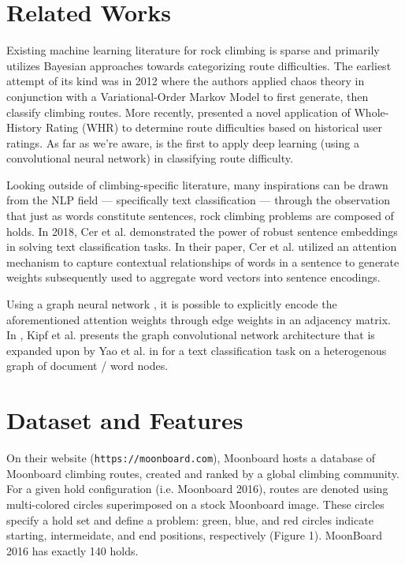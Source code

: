 \documentclass{article}
\begin{document}
\section{Related Works}
Existing machine learning literature for rock climbing is sparse and primarily utilizes Bayesian approaches towards categorizing route difficulties. The earliest attempt of its kind was in 2012 \cite{Phillips_2012} where the authors applied chaos theory in conjunction with a Variational-Order Markov Model to first generate, then classify climbing routes. More recently, \cite{scarff2020estimation} presented a novel application of Whole-History Rating (WHR) \cite{RemiCoulomWHR} to determine route difficulties based on historical user ratings. As far as we're aware, \cite{DoblesCS229} is the first to apply deep learning (using a convolutional neural network) in classifying route difficulty.

Looking outside of climbing-specific literature, many inspirations can be drawn from the NLP field --- specifically text classification --- through the observation that just as words constitute sentences, rock climbing problems are composed of holds. In 2018, Cer et al. \cite{cer2018universal} demonstrated the power of robust sentence embeddings in solving text classification tasks. In their paper, Cer et al. utilized an attention mechanism to capture contextual relationships of words in a sentence to generate weights subsequently used to aggregate word vectors into sentence encodings. 

Using a graph neural network \cite{battaglia2018relational}, it is possible to explicitly encode the aforementioned attention weights through edge weights in an adjacency matrix. In \cite{kipf2016semisupervised}, Kipf et al. presents the graph convolutional network architecture that is expanded upon by Yao et al. in \cite{yao2018graph} for a text classification task on a heterogenous graph of document / word nodes.

\section{Dataset and Features}
On their website (\texttt{https://moonboard.com}), Moonboard hosts a database of Moonboard climbing routes, created and ranked by a global climbing community. For a given hold configuration (i.e. Moonboard 2016), routes are denoted using multi-colored circles superimposed on a stock Moonboard image. These circles specify a hold set and define a problem: green, blue, and red circles indicate starting, intermeidate, and end positions, respectively (Figure 1). MoonBoard 2016 has exactly 140 holds.
\end{document}

